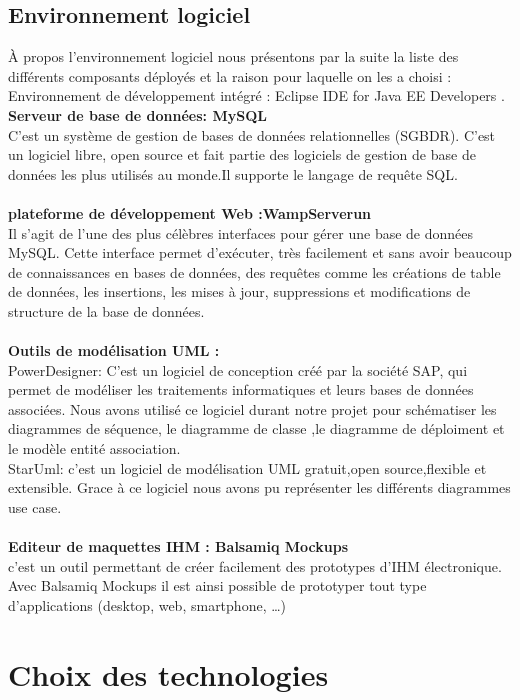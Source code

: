 \documentclass[a4paper,12pt,oneside]{report}
\begin{document}
  \subsection{Environnement logiciel}
  À propos l'environnement logiciel nous présentons par la suite la liste  des différents composants déployés  et la raison pour laquelle on les a choisi : \\
 Environnement de développement intégré : Eclipse IDE for Java EE Developers .\\
 \textbf{Serveur de base de données: MySQL } \\ C'est un système de gestion de bases de données relationnelles (SGBDR). C'est un logiciel libre, open source et  fait partie des logiciels de gestion de base de données les plus utilisés au monde.Il supporte le langage de requête SQL. \\
\\
 \textbf{plateforme de développement Web :WampServerun} \\ Il s'agit de l'une des plus célèbres interfaces pour gérer une base de données MySQL. Cette interface permet d'exécuter, très facilement et sans avoir
beaucoup de connaissances en bases de données, des requêtes comme les créations de table de données, les insertions, les mises à jour, suppressions et modifications de structure de la base de données.\\
\\
 \textbf{Outils de modélisation   UML :} \\   
PowerDesigner: 
  C'est un logiciel de conception créé par la société SAP, qui permet de modéliser les traitements informatiques et leurs bases de données associées. Nous avons utilisé ce logiciel durant notre projet pour schématiser les diagrammes de séquence, le diagramme de classe ,le diagramme de déploiment et le modèle entité association. \\
StarUml: 
c'est un logiciel de modélisation UML gratuit,open source,flexible et extensible.
Grace à ce logiciel nous avons pu représenter les différents diagrammes use case.
\\ 
\\
 \textbf{Editeur de maquettes IHM : Balsamiq Mockups} \\ 
c'est un outil permettant de créer facilement des prototypes d’IHM électronique. Avec Balsamiq Mockups il est ainsi possible de prototyper tout type d’applications (desktop, web, smartphone, …)

\section{Choix des technologies}
\end{document}
